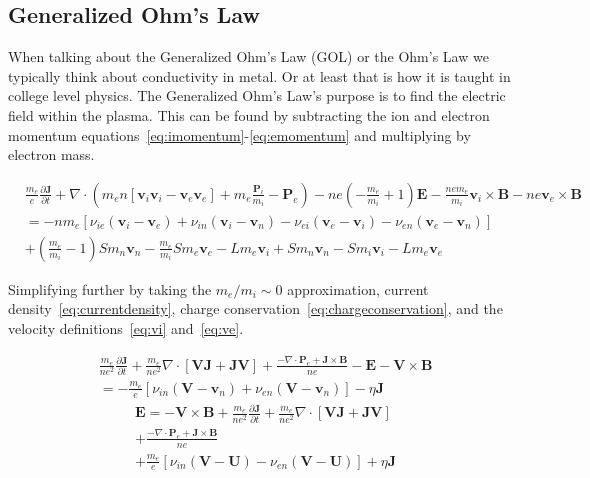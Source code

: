 \documentclass[12pt,upcase]{umlthesis}
\begin{document}
\subsection{Generalized Ohm's Law}\label{sec:ohmslaw}

When talking about the Generalized Ohm's Law (GOL) or the Ohm's Law we typically think about conductivity in metal. Or at least that is how it is taught in college level physics. The Generalized Ohm's Law's purpose is to find the electric field within the plasma. This can be found by subtracting the ion and electron momentum equations~\ref{eq:imomentum}-\ref{eq:emomentum} and multiplying by electron mass.

\begin{equation}
\begin{aligned}
	&\frac{m_e}{e}\frac{\partial \textbf{J}}{\partial t} + \nabla \cdot (m_e n [\textbf{v}_i \textbf{v}_i - \textbf{v}_e \textbf{v}_e] +m_e \frac{\textbf{P}_i}{m_i} - \textbf{P}_e) - n e (-\frac{m_e}{m_i}+1) \textbf{E} - \frac{n e m_e}{m_i} \textbf{v}_i \times \textbf{B} - n e\textbf{v}_e \times \textbf{B} \\
	&= -n m_e [ \nu_{ie} (\textbf{v}_i -\textbf{v}_e) + \nu_{in} (\textbf{v}_i -\textbf{v}_n) - \nu_{ei} (\textbf{v}_e -\textbf{v}_i) - \nu_{en} (\textbf{v}_e -\textbf{v}_n)] \\
	&+ (\frac{m_e}{m_i} - 1) S m_n \textbf{v}_n - \frac{m_e}{m_i} S m_e \textbf{v}_e - L m_e \textbf{v}_i + S m_n \textbf{v}_n - S m_i \textbf{v}_i - L m_e \textbf{v}_e
\end{aligned}
\end{equation}

Simplifying further by taking the $m_e/m_i \sim 0$ approximation, current density~\ref{eq:currentdensity}, charge conservation~\ref{eq:chargeconservation}, and the velocity definitions~\ref{eq:vi} and~\ref{eq:ve}.

\begin{equation}
\begin{aligned}
	&\frac{m_e}{n e^2} \frac{\partial\textbf{J}}{\partial t}+ \frac{m_e}{ne^2} \nabla\cdot[\textbf{V}\textbf{J} + \textbf{J}\textbf{V}] + \frac{-\nabla\cdot\textbf{P}_e + \textbf{J}\times\textbf{B}}{ne}- \textbf{E} - \textbf{V}\times\textbf{B} \\
	& = - \frac{m_e}{e}[\nu_{in} (\textbf{V}-\textbf{v}_n) + \nu_{en}(\textbf{V} - \textbf{v}_n)] - \eta\textbf{J}
\end{aligned}
\end{equation}
\begin{equation}\label{eq:gom}
\begin{aligned}
	&\textbf{E}  = - \textbf{V}\times\textbf{B} + \frac{m_e}{n e^2} \frac{\partial\textbf{J}}{\partial t}+ \frac{m_e}{ne^2} \nabla\cdot[\textbf{V}\textbf{J} + \textbf{J}\textbf{V}] \\
	&+ \frac{-\nabla\cdot\textbf{P}_e + \textbf{J}\times\textbf{B}}{ne} \\
	&  + \frac{m_e}{e}[\nu_{in} (\textbf{V}-\textbf{U}) - \nu_{en}(\textbf{V} - \textbf{U})] + \eta\textbf{J}
\end{aligned}
\end{equation}
\end{document}
